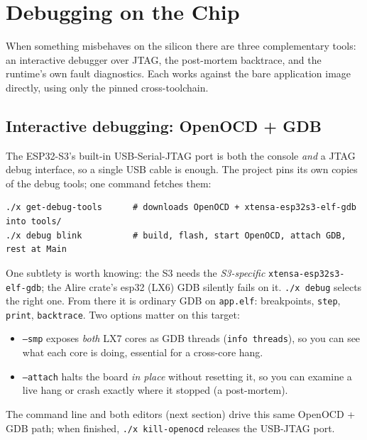 \chapter{Debugging on the Chip}
\label{ch:debug}

When something misbehaves on the silicon there are three complementary tools: an
interactive debugger over JTAG, the post-mortem backtrace, and the runtime's own
fault diagnostics. Each works against the bare application image directly, using
only the pinned cross-toolchain.

\section{Interactive debugging: OpenOCD + GDB}

The ESP32-S3's built-in USB-Serial-JTAG port is both the console \emph{and} a JTAG
debug interface, so a single USB cable is enough. The project pins its own copies
of the debug tools; one command fetches them:

\begin{lstlisting}[style=sh]
./x get-debug-tools      # downloads OpenOCD + xtensa-esp32s3-elf-gdb into tools/
./x debug blink          # build, flash, start OpenOCD, attach GDB, rest at Main
\end{lstlisting}

One subtlety is worth knowing: the S3 needs the \emph{S3-specific}
\texttt{xtensa-esp32s3-elf-gdb}; the Alire crate's esp32 (LX6) GDB silently fails
on it. \texttt{./x debug} selects the right one. From there it is ordinary GDB on
\texttt{app.elf}: breakpoints, \texttt{step}, \texttt{print},
\texttt{backtrace}. Two options matter on this target:

\begin{itemize}
  \item \texttt{--smp} exposes \emph{both} LX7 cores as GDB threads
        (\texttt{info threads}), so you can see what each core is doing,
        essential for a cross-core hang.
  \item \texttt{--attach} halts the board \emph{in place} without resetting it, so
        you can examine a live hang or crash exactly where it stopped (a
        post-mortem).
\end{itemize}

The command line and both editors (next section) drive this same OpenOCD + GDB
path; when finished, \texttt{./x kill-openocd} releases the USB-JTAG port.

